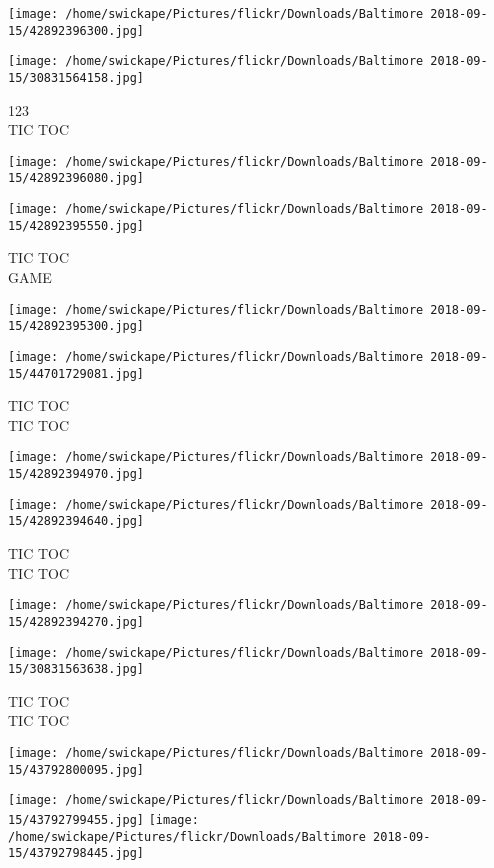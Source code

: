 \documentclass[10pt,letterpaper]{article}
\begin{document}
\texttt{[image: /home/swickape/Pictures/flickr/Downloads/Baltimore 2018-09-15/42892396300.jpg]}

\vspace{0.25in}
\texttt{[image: /home/swickape/Pictures/flickr/Downloads/Baltimore 2018-09-15/30831564158.jpg]}

123\\
TIC TOC
\pagebreak

\texttt{[image: /home/swickape/Pictures/flickr/Downloads/Baltimore 2018-09-15/42892396080.jpg]}

\vspace{0.25in}
\texttt{[image: /home/swickape/Pictures/flickr/Downloads/Baltimore 2018-09-15/42892395550.jpg]}

TIC TOC\\
GAME
\pagebreak

\texttt{[image: /home/swickape/Pictures/flickr/Downloads/Baltimore 2018-09-15/42892395300.jpg]}

\vspace{0.25in}
\texttt{[image: /home/swickape/Pictures/flickr/Downloads/Baltimore 2018-09-15/44701729081.jpg]}

TIC TOC\\
TIC TOC
\pagebreak

\texttt{[image: /home/swickape/Pictures/flickr/Downloads/Baltimore 2018-09-15/42892394970.jpg]}

\vspace{0.25in}
\texttt{[image: /home/swickape/Pictures/flickr/Downloads/Baltimore 2018-09-15/42892394640.jpg]}

TIC TOC\\
TIC TOC
\pagebreak

\texttt{[image: /home/swickape/Pictures/flickr/Downloads/Baltimore 2018-09-15/42892394270.jpg]}

\vspace{0.25in}
\texttt{[image: /home/swickape/Pictures/flickr/Downloads/Baltimore 2018-09-15/30831563638.jpg]}

TIC TOC\\
TIC TOC
\pagebreak

\texttt{[image: /home/swickape/Pictures/flickr/Downloads/Baltimore 2018-09-15/43792800095.jpg]}

\vspace{0.25in}
\texttt{[image: /home/swickape/Pictures/flickr/Downloads/Baltimore 2018-09-15/43792799455.jpg]}
\texttt{[image: /home/swickape/Pictures/flickr/Downloads/Baltimore 2018-09-15/43792798445.jpg]}
\end{document}
